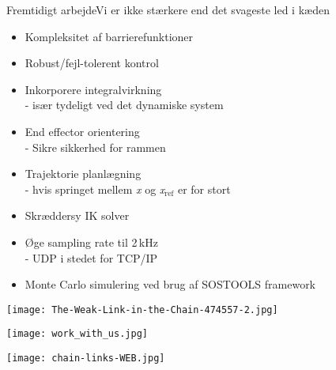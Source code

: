 \begin{frame}{Fremtidigt arbejde}{Vi er ikke stærkere end det svageste led i kæden}
\begin{minipage}{0.65\textwidth}
\begin{block}{}
	\begin{itemize}
		\item \normalsize Kompleksitet af barrierefunktioner
		\item \normalsize Robust/fejl-tolerent kontrol %
		\item \normalsize Inkorporere integralvirkning \\ 
		\scriptsize {\color{white}{m}} - især tydeligt ved det dynamiske system
		\item \normalsize End effector orientering \\
		\scriptsize {\color{white}{m}} -  Sikre sikkerhed for rammen
		\item \normalsize  Trajektorie planlægning \\ 
		\scriptsize {\color{white}{m}} - hvis springet mellem \textit{x} og \textit{x}$_{\text{ref}}$ er for stort
		\item \normalsize Skræddersy IK solver
		\item Øge sampling rate til 2\,kHz \\
		\scriptsize {\color{white}{m}} - UDP i stedet for TCP/IP
		\item \normalsize  Monte Carlo simulering ved brug af SOSTOOLS framework
	\end{itemize}
\end{block}
\end{minipage}
\begin{minipage}{0.3\textwidth}
\texttt{[image: The-Weak-Link-in-the-Chain-474557-2.jpg]}
\vspace*{0.2cm}

\texttt{[image: work\_with\_us.jpg]}
\vspace*{0.2cm}

\texttt{[image: chain-links-WEB.jpg]}
\end{minipage}
\end{frame}